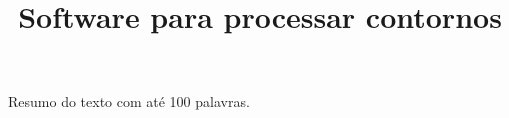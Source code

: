 \documentclass[brazil]{article}
\begin{document}
\graphicspath{{figs/}{out/}{data/}{lily/}}

\title{Software para processar contornos}
\author{}{}{}{}

\begin{sumario}
  Resumo do texto com até 100 palavras.  
\end{sumario}




\renewcommand{\refname}{Referências Bibliográficas}


\end{document}
